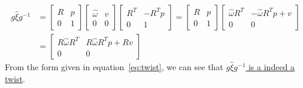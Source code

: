 \begin{align*}
    g \widehat{\xi} g^{-1}
     & =
    \begin{bmatrix}
        R & p \\
        0 & 1
    \end{bmatrix}
    \begin{bmatrix}
        \widehat{\omega} & v \\
        0                & 0
    \end{bmatrix}
    \begin{bmatrix}
        R^{T} & -R^{T} p \\
        0     & 1
    \end{bmatrix}
    =
    \begin{bmatrix}
        R & p \\
        0 & 1
    \end{bmatrix}
    \begin{bmatrix}
        \widehat{\omega} R^{T} & -\widehat{\omega} R^{T} p + v \\
        0                      & 0
    \end{bmatrix}
    \\
     & =
    \begin{bmatrix}
        R \widehat{\omega} R^{T} & R \widehat{\omega} R^{T} p + R v \\
        0                        & 0
    \end{bmatrix}
\end{align*}
From the form given in equation~\eqref{eq:twist}, we can see that \underline{\( g \widehat{\xi} g^{-1} \) is a indeed a twist}.

